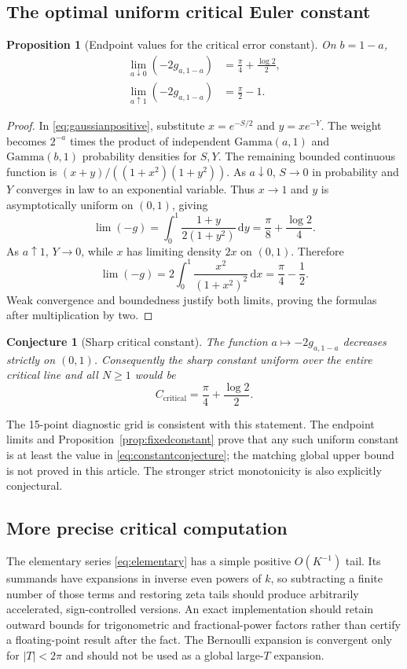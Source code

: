 \documentclass[11pt]{article}
\numberwithin{equation}{section}
\newtheorem{proposition}[theorem]{Proposition}
\newtheorem{conjecture}[theorem]{Conjecture}
\theoremstyle{definition}\newtheorem{definition}[theorem]{Definition}
\theoremstyle{remark}\newtheorem{remark}[theorem]{Remark}
\newcommand{\dd}{\,\mathrm d}
\begin{document}
\subsection{The optimal uniform critical Euler constant}
\begin{proposition}[Endpoint values for the critical error constant]
\label{prop:endlimits}
On $b=1-a$,
\begin{align}
 \lim_{a\downarrow0}(-2g_{a,1-a})&=\frac\pi4+\frac{\log2}{2},
 \label{eq:leftlimit}\\
 \lim_{a\uparrow1}(-2g_{a,1-a})&=\frac\pi2-1.
 \label{eq:rightlimit}
\end{align}
\end{proposition}
\begin{proof}
In \eqref{eq:gaussianpositive}, substitute
$x=e^{-S/2}$ and $y=xe^{-Y}$. The weight becomes $2^{-a}$ times
the product of independent $\mathrm{Gamma}(a,1)$ and
$\mathrm{Gamma}(b,1)$ probability densities for $S,Y$.
The remaining bounded continuous function is
$(x+y)/((1+x^2)(1+y^2))$.
As $a\downarrow0$, $S\to0$ in probability and $Y$ converges in law
to an exponential variable. Thus $x\to1$ and $y$ is asymptotically
uniform on $(0,1)$, giving
\[
 \lim(-g)=\int_0^1\frac{1+y}{2(1+y^2)}\dd y
 =\frac\pi8+\frac{\log2}{4}.
\]
As $a\uparrow1$, $Y\to0$, while $x$ has limiting density $2x$ on
$(0,1)$. Therefore
\[
 \lim(-g)=2\int_0^1\frac{x^2}{(1+x^2)^2}\dd x
 =\frac\pi4-\frac12.
\]
Weak convergence and boundedness justify both limits, proving the
formulas after multiplication by two.
\end{proof}

\begin{conjecture}[Sharp critical constant]\label{conj:constant}
The function $a\mapsto-2g_{a,1-a}$ decreases strictly on $(0,1)$.
Consequently the sharp constant uniform over the entire critical line
and all $N\ge1$ would be
\begin{equation}\label{eq:constantconjecture}
 C_{\mathrm{critical}}=\frac\pi4+\frac{\log2}{2}.
\end{equation}
\end{conjecture}
The 15-point diagnostic grid is consistent with this statement.
The endpoint limits and Proposition~\ref{prop:fixedconstant} prove
that any such uniform constant is at least the value in
\eqref{eq:constantconjecture}; the matching global upper bound is
not proved in this article. The stronger strict monotonicity is
also explicitly conjectural.

\subsection{More precise critical computation}
The elementary series \eqref{eq:elementary} has a simple positive
$O(K^{-1})$ tail. Its summands have expansions in inverse even powers
of $k$, so subtracting a finite number of those terms and restoring
zeta tails should produce arbitrarily accelerated, sign-controlled
versions. An exact implementation should retain outward bounds for
trigonometric and fractional-power factors rather than certify a
floating-point result after the fact. The Bernoulli expansion is
convergent only for $|T|<2\pi$ and should not be used as a global
large-$T$ expansion.
\end{document}
